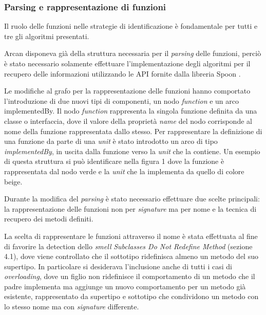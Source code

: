         \subsubsection{Parsing e rappresentazione di funzioni}
            Il ruolo delle funzioni nelle strategie di identificazione è fondamentale per tutti e tre gli algoritmi presentati.
            
            Arcan disponeva già della struttura necessaria per il \textit{parsing} delle funzioni, perciò è stato necessario solamente effettuare l'implementazione degli algoritmi per il recupero delle informazioni utilizzando le API fornite dalla libreria Spoon \cite{pawlak:hal-01169705}. 

            Le modifiche al grafo per la rappresentazione delle funzioni hanno comportato l'introduzione di due nuovi tipi di componenti, un nodo \textit{function} e un arco implementedBy. Il nodo \textit{function} rappresenta la singola funzione definita da una classe o interfaccia, dove il valore della proprietà \textit{name} del nodo corrisponde al nome della funzione rappresentata dallo stesso. Per rappresentare la definizione di una funzione da parte di una \textit{unit} è stato introdotto un arco di tipo \textit{implementedBy}, in uscita dalla funzione verso la \textit{unit} che la contiene.
            Un esempio di questa struttura si può identificare nella figura 1 dove la funzione è rappresentata dal nodo verde e la \textit{unit} che la implementa da quello di colore beige. 
            
            Durante la modifica del \textit{parsing} è stato necessario effettuare due scelte principali: la rappresentazione delle funzioni non per \textit{signature} ma per nome e la tecnica di recupero dei metodi definiti.
            
            La scelta di rappresentare le funzioni attraverso il nome è stata effettuata al fine di favorire la detection dello \textit{smell} \textit{Subclasses Do Not Redefine Method} (sezione 4.1), dove viene controllato che il sottotipo ridefinisca almeno un metodo del suo supertipo. In particolare si desiderava l'inclusione anche di tutti i casi di \textit{overloading}, dove un figlio non ridefinisce il comportamento di un metodo che il padre implementa ma aggiunge un nuovo comportamento per un metodo già esistente, rappresentato da supertipo e sottotipo che condividono un metodo con lo stesso nome ma con \textit{signature} differente.
            
